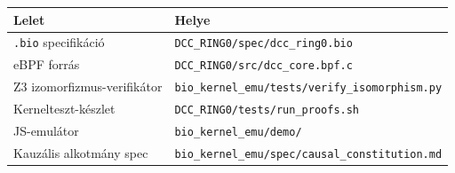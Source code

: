 \documentclass[11pt,a4paper,twoside]{article}
\begin{document}
\begin{tabular}{@{}ll@{}}
\toprule
\textbf{Lelet} & \textbf{Helye} \\ \midrule
\texttt{.bio} specifikáció & \texttt{DCC\_RING0/spec/dcc\_ring0.bio} \\
eBPF forrás                & \texttt{DCC\_RING0/src/dcc\_core.bpf.c} \\
Z3 izomorfizmus-verifikátor & \texttt{bio\_kernel\_emu/tests/verify\_isomorphism.py} \\
Kernelteszt-készlet        & \texttt{DCC\_RING0/tests/run\_proofs.sh} \\
JS-emulátor                & \texttt{bio\_kernel\_emu/demo/} \\
Kauzális alkotmány spec    & \texttt{bio\_kernel\_emu/spec/causal\_constitution.md} \\
\bottomrule
\end{tabular}
\end{document}
